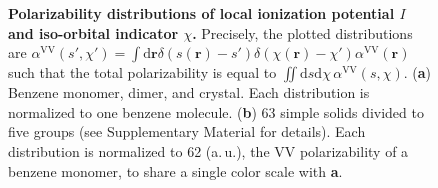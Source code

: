 \begin{figure}[t!]
\caption{\textbf{Polarizability distributions of local ionization potential $I$ and iso-orbital indicator $\chi$.}
Precisely, the plotted distributions are $\alpha^\text{VV}(s',\chi')=\int\mathrm d\mathbf r\delta(s(\mathbf r)-s')\delta(\chi(\mathbf r)-\chi')\alpha^\text{VV}(\mathbf r)$ such that the total polarizability is equal to $\iint\mathrm ds\mathrm d\chi\,\alpha^\text{VV}(s,\chi)$.
(\textbf a) Benzene monomer, dimer, and crystal.
Each distribution is normalized to one benzene molecule.
(\textbf b) 63 simple solids divided to five groups (see Supplementary Material for details).
Each distribution is normalized to 62 (a.\,u.), the VV polarizability of a benzene monomer, to share a single color scale with \textbf{a}.
}\label{fig:pol-hists}
\end{figure}

